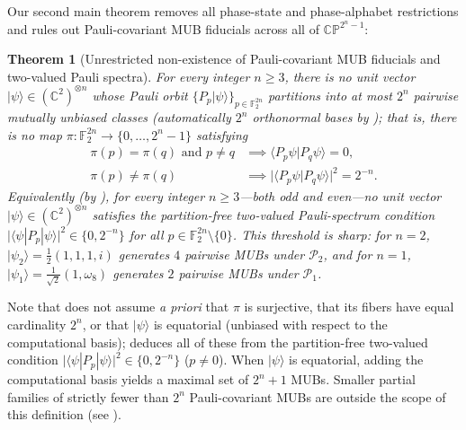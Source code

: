 \documentclass[11pt,a4paper]{article}
\theoremstyle{plain}
\newtheorem{maintheorem}{Theorem}
\theoremstyle{definition}
\theoremstyle{remark}
\newcommand{\C}{\mathbb{C}}
\newcommand{\F}{\mathbb{F}}
\newcommand{\CP}{\mathbb{CP}}
\newcommand{\Pauli}{\mathcal{P}}
\newcommand{\ket}[1]{|#1\rangle}
\newcommand{\braket}[2]{\langle#1|#2\rangle}
\newcommand{\expval}[2]{\langle#1|#2|#1\rangle}
\newcommand{\abs}[1]{\lvert#1\rvert}
\numberwithin{equation}{section}
\begin{document}
Our second main theorem removes all phase-state and phase-alphabet restrictions and rules out Pauli-covariant MUB fiducials across all of $\CP^{2^n-1}$:

\begin{maintheorem}[Unrestricted non-existence of Pauli-covariant MUB fiducials and two-valued Pauli spectra]\label{thm:no-pauli-mub}
For every integer $n \ge 3$, there is no unit vector $\ket{\psi} \in (\C^2)^{\otimes n}$ whose Pauli orbit $\{P_p\ket{\psi}\}_{p \in \F_2^{2n}}$ partitions into at most $2^n$ pairwise mutually unbiased classes (automatically $2^n$ orthonormal bases by ); that is, there is no map $\pi : \F_2^{2n} \to \{0, \dots, 2^n - 1\}$ satisfying
\begin{align*}
  \pi(p) = \pi(q) \text{ and } p \neq q &\implies \braket{P_p\psi}{P_q\psi} = 0, \\
  \pi(p) \neq \pi(q) &\implies \abs{\braket{P_p\psi}{P_q\psi}}^2 = 2^{-n}.
\end{align*}
Equivalently (by ), for every integer $n \ge 3$---both odd and even---no unit vector $\ket{\psi} \in (\C^2)^{\otimes n}$ satisfies the partition-free two-valued Pauli-spectrum condition $\abs{\expval{\psi}{P_p}}^2 \in \{0, 2^{-n}\}$ for all $p \in \F_2^{2n} \setminus \{0\}$. This threshold is sharp: for $n = 2$, $\ket{\psi_2} = \frac{1}{2}(1, 1, 1, i)$ generates $4$ pairwise MUBs under $\Pauli_2$, and for $n = 1$, $\ket{\psi_1} = \frac{1}{\sqrt{2}}(1, \omega_8)$ generates $2$ pairwise MUBs under $\Pauli_1$.
\end{maintheorem}

Note that  does not assume \emph{a priori} that $\pi$ is surjective, that its fibers have equal cardinality $2^n$, or that $\ket{\psi}$ is equatorial (unbiased with respect to the computational basis);  deduces all of these from the partition-free two-valued condition $\abs{\expval{\psi}{P_p}}^2 \in \{0, 2^{-n}\}$ ($p \neq 0$). When $\ket{\psi}$ is equatorial, adding the computational basis yields a maximal set of $2^n + 1$ MUBs. Smaller partial families of strictly fewer than $2^n$ Pauli-covariant MUBs are outside the scope of this definition (see ).
\end{document}
